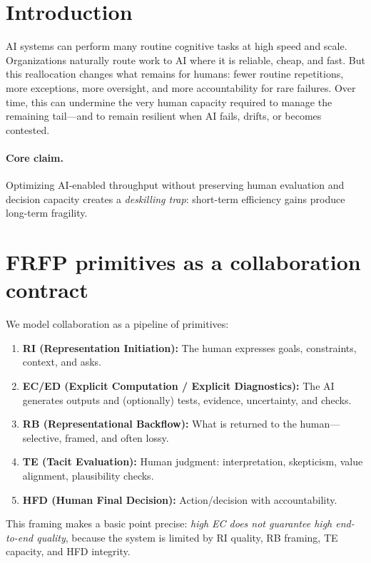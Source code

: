 

\section{Introduction}
AI systems can perform many routine cognitive tasks at high speed and scale. Organizations naturally route work to AI where it is reliable, cheap, and fast. But this reallocation changes what remains for humans: fewer routine repetitions, more exceptions, more oversight, and more accountability for rare failures. Over time, this can undermine the very human capacity required to manage the remaining tail---and to remain resilient when AI fails, drifts, or becomes contested.

\paragraph{Core claim.}
Optimizing AI-enabled throughput without preserving human evaluation and decision capacity creates a \emph{deskilling trap}: short-term efficiency gains produce long-term fragility.

\section{FRFP primitives as a collaboration contract}
We model collaboration as a pipeline of primitives:
\begin{enumerate}[label=\textbf{(\Alph*)}, leftmargin=*]
  \item \textbf{RI (Representation Initiation):} The human expresses goals, constraints, context, and asks.
  \item \textbf{EC/ED (Explicit Computation / Explicit Diagnostics):} The AI generates outputs and (optionally) tests, evidence, uncertainty, and checks.
  \item \textbf{RB (Representational Backflow):} What is returned to the human---selective, framed, and often lossy.
  \item \textbf{TE (Tacit Evaluation):} Human judgment: interpretation, skepticism, value alignment, plausibility checks.
  \item \textbf{HFD (Human Final Decision):} Action/decision with accountability.
\end{enumerate}

This framing makes a basic point precise: \emph{high EC does not guarantee high end-to-end quality}, because the system is limited by RI quality, RB framing, TE capacity, and HFD integrity.

